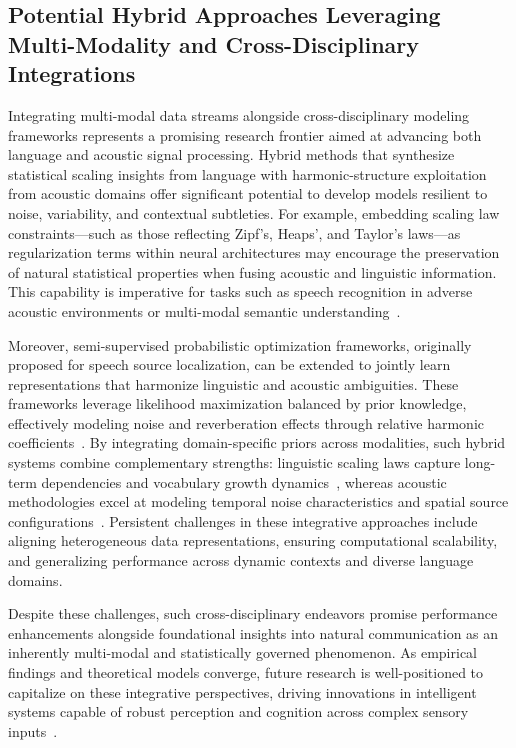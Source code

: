 \documentclass[sigconf]{acmart}
\begin{document}
\subsection{Potential Hybrid Approaches Leveraging Multi-Modality and Cross-Disciplinary Integrations}

Integrating multi-modal data streams alongside cross-disciplinary modeling frameworks represents a promising research frontier aimed at advancing both language and acoustic signal processing. Hybrid methods that synthesize statistical scaling insights from language with harmonic-structure exploitation from acoustic domains offer significant potential to develop models resilient to noise, variability, and contextual subtleties. For example, embedding scaling law constraints—such as those reflecting Zipf's, Heaps', and Taylor's laws—as regularization terms within neural architectures may encourage the preservation of natural statistical properties when fusing acoustic and linguistic information. This capability is imperative for tasks such as speech recognition in adverse acoustic environments or multi-modal semantic understanding~\cite{ref51,ref52}.

Moreover, semi-supervised probabilistic optimization frameworks, originally proposed for speech source localization, can be extended to jointly learn representations that harmonize linguistic and acoustic ambiguities. These frameworks leverage likelihood maximization balanced by prior knowledge, effectively modeling noise and reverberation effects through relative harmonic coefficients~\cite{ref52}. By integrating domain-specific priors across modalities, such hybrid systems combine complementary strengths: linguistic scaling laws capture long-term dependencies and vocabulary growth dynamics~\cite{ref51}, whereas acoustic methodologies excel at modeling temporal noise characteristics and spatial source configurations~\cite{ref52}. Persistent challenges in these integrative approaches include aligning heterogeneous data representations, ensuring computational scalability, and generalizing performance across dynamic contexts and diverse language domains.

Despite these challenges, such cross-disciplinary endeavors promise performance enhancements alongside foundational insights into natural communication as an inherently multi-modal and statistically governed phenomenon. As empirical findings and theoretical models converge, future research is well-positioned to capitalize on these integrative perspectives, driving innovations in intelligent systems capable of robust perception and cognition across complex sensory inputs~\cite{ref51,ref52}.
\end{document}
